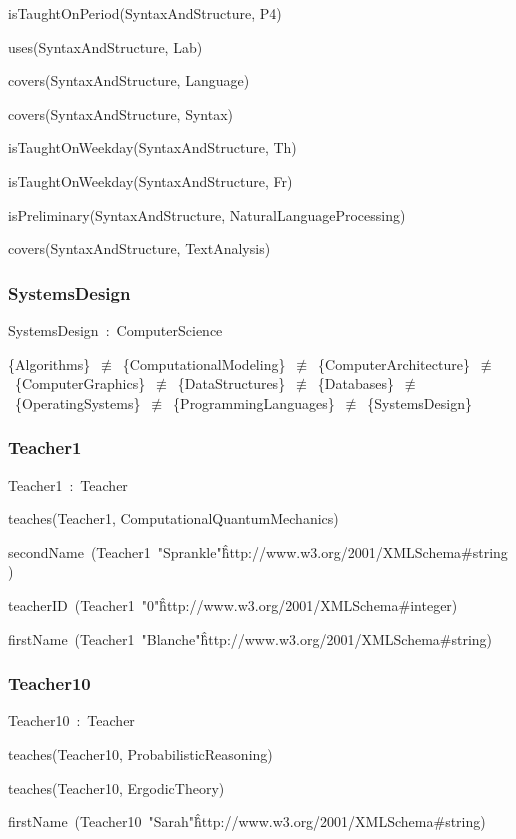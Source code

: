 \documentclass{article}
\begin{document}
isTaughtOnPeriod(SyntaxAndStructure, P4)

uses(SyntaxAndStructure, Lab)

covers(SyntaxAndStructure, Language)

covers(SyntaxAndStructure, Syntax)

isTaughtOnWeekday(SyntaxAndStructure, Th)

isTaughtOnWeekday(SyntaxAndStructure, Fr)

isPreliminary(SyntaxAndStructure, NaturalLanguageProcessing)

covers(SyntaxAndStructure, TextAnalysis)

\subsubsection*{SystemsDesign}

SystemsDesign~:~ComputerScience

\{Algorithms\}~\ensuremath{\not\equiv}~\{ComputationalModeling\}~\ensuremath{\not\equiv}~\{ComputerArchitecture\}~\ensuremath{\not\equiv}~\{ComputerGraphics\}~\ensuremath{\not\equiv}~\{DataStructures\}~\ensuremath{\not\equiv}~\{Databases\}~\ensuremath{\not\equiv}~\{OperatingSystems\}~\ensuremath{\not\equiv}~\{ProgrammingLanguages\}~\ensuremath{\not\equiv}~\{SystemsDesign\}

\subsubsection*{Teacher1}

Teacher1~:~Teacher

teaches(Teacher1, ComputationalQuantumMechanics)

secondName~(Teacher1~"Sprankle"\^\^http://www.w3.org/2001/XMLSchema#string)

teacherID~(Teacher1~"0"\^\^http://www.w3.org/2001/XMLSchema#integer)

firstName~(Teacher1~"Blanche"\^\^http://www.w3.org/2001/XMLSchema#string)

\subsubsection*{Teacher10}

Teacher10~:~Teacher

teaches(Teacher10, ProbabilisticReasoning)

teaches(Teacher10, ErgodicTheory)

firstName~(Teacher10~"Sarah"\^\^http://www.w3.org/2001/XMLSchema#string)
\end{document}

